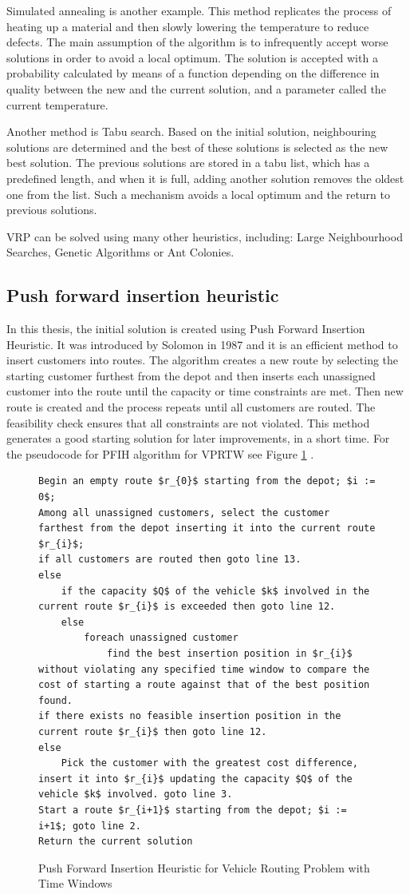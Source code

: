 \documentclass[a4paper,twoside,12pt]{book}
\begin{document}
Simulated annealing is another example. This method replicates the process of heating up a material and then slowly lowering the temperature to reduce defects. The main assumption of the algorithm is to infrequently accept worse solutions in order to avoid a local optimum. The solution is accepted with a probability calculated by means of a function depending on the difference in quality between the new and the current solution, and a parameter called the current temperature.

Another method is Tabu search. Based on the initial solution, neighbouring solutions are determined and the best of these solutions is selected as the new best solution. The previous solutions are stored in a tabu list, which has a predefined length, and when it is full, adding another solution removes the oldest one from the list. Such a mechanism avoids a local optimum and the return to previous solutions. 

VRP can be solved using many other heuristics, including: Large Neighbourhood Searches, Genetic Algorithms or Ant Colonies.

\subsection{Push forward insertion heuristic}
In this thesis, the initial solution is created using Push Forward Insertion Heuristic. It was introduced by Solomon \cite{bib:article:solomon} in 1987 and it is an efficient method to insert customers into routes. The algorithm creates a new route by selecting the starting customer furthest from the depot and then inserts each unassigned customer into the route until the capacity or time constraints are met. Then new route is created and the process repeats until all customers are routed. The feasibility check ensures that all constraints are not violated. This method generates a good starting solution for later improvements, in a short time. For the pseudocode for PFIH algorithm for VPRTW see Figure \ref{fig:PFIH} \cite{bib:chapter:PFIH}.
\begin{figure}[tb]
\centering
\begin{lstlisting}[mathescape=true]
Begin an empty route $r_{0}$ starting from the depot; $i := 0$;
Among all unassigned customers, select the customer farthest from the depot inserting it into the current route $r_{i}$;
if all customers are routed then goto line 13.
else
    if the capacity $Q$ of the vehicle $k$ involved in the current route $r_{i}$ is exceeded then goto line 12.
	else
    	foreach unassigned customer
    		find the best insertion position in $r_{i}$ without violating any specified time window to compare the cost of starting a route against that of the best position found.   
if there exists no feasible insertion position in the current route $r_{i}$ then goto line 12.
else
	Pick the customer with the greatest cost difference, insert it into $r_{i}$ updating the capacity $Q$ of the vehicle $k$ involved. goto line 3.
Start a route $r_{i+1}$ starting from the depot; $i := i+1$; goto line 2.
Return the current solution
\end{lstlisting}
\caption{Push Forward Insertion Heuristic for Vehicle Routing Problem with Time Windows}
\label{fig:PFIH}
\end{figure}
\end{document}
